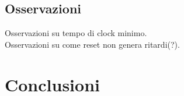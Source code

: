 \documentclass{article}
\begin{document}
\subsection{Osservazioni}
Osservazioni su tempo di clock minimo.\\
Osservazioni su come reset non genera ritardi(?).


\section{Conclusioni}


\end{document}
